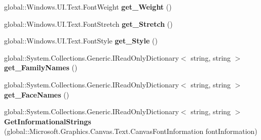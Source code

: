 \begin{DoxyCompactItemize}
\mbox{\label{interface_microsoft_1_1_graphics_1_1_canvas_1_1_text_1_1_i_canvas_font_face_ad97d3d431367976150ce2a63ff9246e9}} 
global\+::\+Windows.\+U\+I.\+Text.\+Font\+Weight {\bfseries get\+\_\+\+Weight} ()
\item 
\mbox{\label{interface_microsoft_1_1_graphics_1_1_canvas_1_1_text_1_1_i_canvas_font_face_a9caa5dbc136e73f4f101f68caf4998a9}} 
global\+::\+Windows.\+U\+I.\+Text.\+Font\+Stretch {\bfseries get\+\_\+\+Stretch} ()
\item 
\mbox{\label{interface_microsoft_1_1_graphics_1_1_canvas_1_1_text_1_1_i_canvas_font_face_ade1356d4fa0f617d15664aeed9c5f1a3}} 
global\+::\+Windows.\+U\+I.\+Text.\+Font\+Style {\bfseries get\+\_\+\+Style} ()
\item 
\mbox{\label{interface_microsoft_1_1_graphics_1_1_canvas_1_1_text_1_1_i_canvas_font_face_a73f0fb8007a55fff8060acaf2333c43c}} 
global\+::\+System.\+Collections.\+Generic.\+I\+Read\+Only\+Dictionary$<$ string, string $>$ {\bfseries get\+\_\+\+Family\+Names} ()
\item 
\mbox{\label{interface_microsoft_1_1_graphics_1_1_canvas_1_1_text_1_1_i_canvas_font_face_a48b2ec346abde62b9c208edbedac56c1}} 
global\+::\+System.\+Collections.\+Generic.\+I\+Read\+Only\+Dictionary$<$ string, string $>$ {\bfseries get\+\_\+\+Face\+Names} ()
\item 
\mbox{\label{interface_microsoft_1_1_graphics_1_1_canvas_1_1_text_1_1_i_canvas_font_face_a1a0aad2a6603611b3f19911eb6908380}} 
global\+::\+System.\+Collections.\+Generic.\+I\+Read\+Only\+Dictionary$<$ string, string $>$ {\bfseries Get\+Informational\+Strings} (global\+::\+Microsoft.\+Graphics.\+Canvas.\+Text.\+Canvas\+Font\+Information font\+Information)
\item 
\mbox{\label{interface_microsoft_1_1_graphics_1_1_canvas_1_1_text_1_1_i_canvas_font_face_a5fedc92111007ced9ad11c7f8c3cca05}} 

\end{DoxyCompactItemize}
